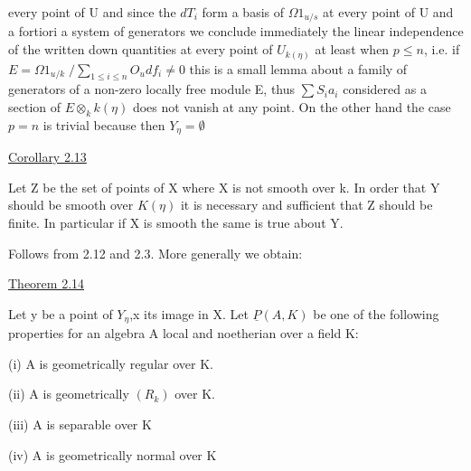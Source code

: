 
every point of U and since the $dT_i$ form a basis of $\Omega 1_{u/s}$ at every
point of U and a fortiori a system of generators we conclude
immediately the linear independence of the written down quantities
at every point of $U_{k(\eta)}$ at least when $p \leq n$, i.e.
if $E = \Omega 1_{u/k} \;/ \sum\limits_{1 \leq i \leq n} O_u df_i \neq 0$ this is a small lemma about a family of
generators of a non-zero locally free module E, thus $\sum S_i a_i$
considered as a section of $E \otimes_k k(\eta)$ does not vanish at any point.
On the other hand the case $p = n$ is trivial because then $Y_\eta = \emptyset$

\uline{Corollary 2.13}

Let Z be the set of points of X where X is not smooth over k.
In order that Y should be smooth over $K(\eta)$ it is necessary and
sufficient that Z should be finite. In particular if X is smooth
the same is true about Y.

Follows from 2.12 and 2.3. More generally we obtain:

\uline{Theorem 2.14}

Let y be a point of $Y_\eta$,x its image in X. Let $\underline{P}(A,K)$ be one of
the following properties for an algebra A local and noetherian
over a field K:

(i) A is geometrically regular over K.

(ii) A is geometrically $(R_k)$ over K.

(iii) A is separable over K

(iv) A is geometrically normal over K
